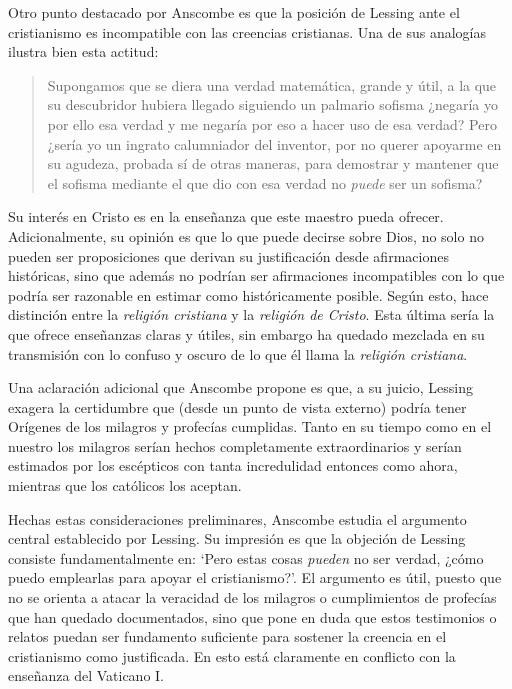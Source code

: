 Otro punto destacado por Anscombe es que la posición de Lessing ante el cristianismo es incompatible con las creencias cristianas. Una de sus analogías ilustra bien esta actitud: \blockquote[{\cite[449]{lessing1982escritos:demo}}]{Supongamos que se diera una verdad matemática, grande y útil, a la que su descubridor hubiera llegado siguiendo un palmario sofisma \textelp{} ¿negaría yo por ello esa verdad y me negaría por eso a hacer uso de esa verdad? Pero ¿sería yo un ingrato calumniador del inventor, por no querer apoyarme en su agudeza, probada sí de otras maneras, para demostrar y mantener que el sofisma mediante el que dio con esa verdad no \emph{puede} ser un sofisma?} Su interés en Cristo es en la enseñanza que este maestro pueda ofrecer. Adicionalmente, su opinión es que lo que puede decirse sobre Dios, no solo no pueden ser proposiciones que derivan su justificación desde afirmaciones históricas, sino que además no podrían ser afirmaciones incompatibles con lo que podría ser razonable en estimar como históricamente posible. Según esto, hace distinción entre la \emph{religión cristiana} y la \emph{religión de Cristo}. Esta última sería la que ofrece enseñanzas claras y útiles, sin embargo ha quedado mezclada en su transmisión con lo confuso y oscuro de lo que él llama la \emph{religión cristiana}.

Una aclaración adicional que Anscombe propone es que, a su juicio, Lessing exagera la certidumbre que (desde un punto de vista externo) podría tener Orígenes de los milagros y profecías cumplidas. Tanto en su tiempo como en el nuestro los milagros serían hechos completamente extraordinarios y serían estimados por los escépticos con tanta incredulidad entonces como ahora, mientras que los católicos los aceptan.

Hechas estas consideraciones preliminares, Anscombe estudia el argumento central establecido por Lessing. Su impresión es que la objeción de Lessing consiste fundamentalmente en: \enquote*{Pero estas cosas \emph{pueden} no ser verdad, ¿cómo puedo emplearlas para apoyar el cristianismo?}. El argumento es útil, puesto que no se orienta a atacar la veracidad de los milagros o cumplimientos de profecías que han quedado documentados, sino que pone en duda que estos testimonios o relatos puedan ser fundamento suficiente para sostener la creencia en el cristianismo como justificada. En esto está claramente en conflicto con la enseñanza del Vaticano I.

